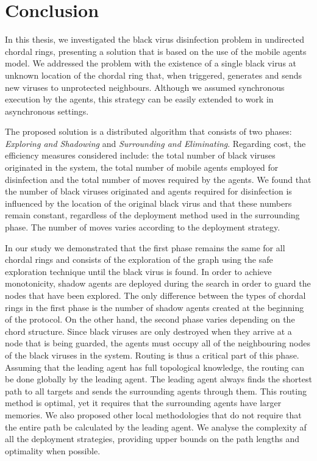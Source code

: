 \chapter {Conclusion}
\label{CON}

In  this thesis, we investigated the black virus disinfection problem in undirected chordal rings, presenting  a solution that is based on the use of the mobile agents model.
We addressed  the problem with the existence of  a single black virus at unknown location of the chordal ring that, when triggered, generates and sends new viruses to unprotected neighbours.  Although we assumed synchronous execution by the agents,  this strategy can be easily extended to work in asynchronous settings. 

The proposed solution is a distributed algorithm that consists of two phases: {\em Exploring and Shadowing} and {\em Surrounding and Eliminating}. Regarding cost, the efficiency measures considered include: the total number of black viruses originated in the system, the total number of mobile agents employed for disinfection and the total number of moves required by the agents. We found that the number of black viruses originated and agents required for disinfection is influenced by the location of the original black virus and that these numbers remain constant, regardless of the deployment method used in the surrounding phase. The number of moves varies according to the deployment strategy.


In our study we demonstrated that the first phase remains the same for all chordal rings and consists of the exploration of the graph using the safe exploration technique until the black virus is found. In order to achieve monotonicity, shadow agents are deployed during the search in order to guard the nodes that have been explored. The only difference between the types of chordal rings in the first phase is the number of shadow agents created at the beginning of the protocol. On the other hand, the second phase varies depending on the chord structure. Since black viruses are only destroyed when they arrive at a node that is being guarded, the agents must occupy all of the neighbouring nodes of the black viruses in the system. Routing is thus a critical part of this phase.
Assuming that the leading agent has full topological knowledge, the routing can be done globally by the leading agent. The leading agent always finds the shortest path to all targets and sends the surrounding agents through them. This routing method is optimal, yet it requires that the surrounding agents have larger memories. We also proposed other local methodologies that do not require that the entire path be calculated by the leading agent. We analyse the complexity af all the deployment strategies, providing upper bounds on the path lengths and optimality when possible.

